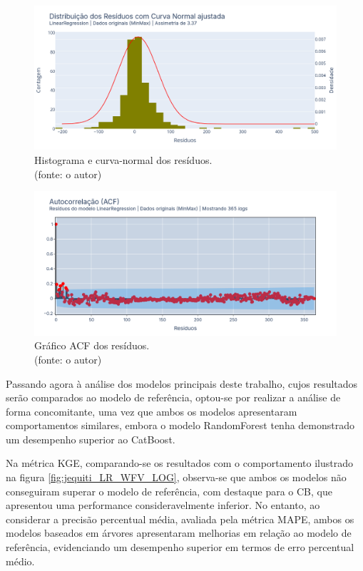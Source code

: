 \begin{figure}[!h]
\centering
\includegraphics[scale=0.33]{Figuras/jequiti/resultados/LR_WFV_SCLD_RESID_x_CURVA_NORMAL.png}
\caption{Histograma e curva-normal dos resíduos.\\(fonte: o autor)}
\label{fig:jequiti_LR_WFV_SCLD_RESID_x_CURVA_NORMAL}
\end{figure}

\begin{figure}[!h]
\centering
\includegraphics[scale=0.33]{Figuras/jequiti/resultados/LR_WFV_SCLD_RESID_ACF.png}
\caption{Gráfico ACF dos resíduos.\\(fonte: o autor)}
\label{fig:jequiti_LR_WFV_SCLD_RESID_ACF}
\end{figure}
\clearpage

Passando agora à análise dos modelos principais deste trabalho, cujos resultados serão comparados ao modelo de referência, optou-se por realizar a análise de forma concomitante, uma vez que ambos os modelos apresentaram comportamentos similares, embora o modelo RandomForest tenha demonstrado um desempenho superior ao CatBoost.

Na métrica KGE, comparando-se os resultados com o comportamento ilustrado na figura \ref{fig:jequiti_LR_WFV_LOG}, observa-se que ambos os modelos não conseguiram superar o modelo de referência, com destaque para o CB, que apresentou uma performance consideravelmente inferior. No entanto, ao considerar a precisão percentual média, avaliada pela métrica MAPE, ambos os modelos baseados em árvores apresentaram melhorias em relação ao modelo de referência, evidenciando um desempenho superior em termos de erro percentual médio.

